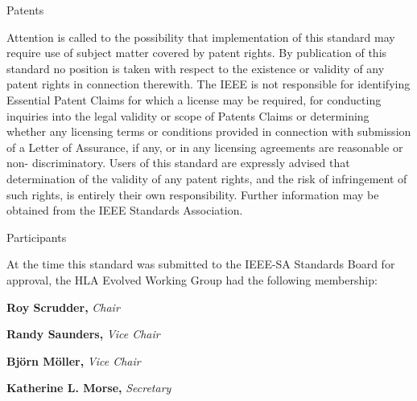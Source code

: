 \vspace{17.73pt}
{\frontSectionHeading Patents\par}

\vspace{12.45pt}
Attention is called to the possibility that implementation of this standard may require use of subject matter\linebreak
covered by patent rights. By publication of this standard no position is taken with respect to the existence or\linebreak
validity of any patent rights in connection therewith. The IEEE is not responsible for identifying Essential\linebreak
Patent Claims for which a license may be required, for conducting inquiries into the legal validity or scope\linebreak
of Patents Claims or determining whether any licensing terms or conditions provided in connection with\linebreak
submission of a Letter of Assurance, if any, or in any licensing agreements are reasonable or non-\linebreak
discriminatory. Users of this standard are expressly advised that determination of the validity of any patent\linebreak
rights, and the risk of infringement of such rights, is entirely their own responsibility. Further information\linebreak
may be obtained from the IEEE Standards Association.\par

\vspace{18.11pt}
{\frontSectionHeading Participants\par}

\vspace{12.42pt}
At the time this standard was submitted to the IEEE-SA Standards Board for approval, the HLA Evolved\linebreak
Working Group had the following membership:\par

\vspace{12.25pt}
{\centering\frontOfficer
\textbf{Roy Scrudder,} \textit{Chair}\par
\textbf{Randy Saunders,} \textit{Vice Chair}\par
\textbf{Björn Möller,} \textit{Vice Chair}\par
\textbf{Katherine L. Morse,} \textit{Secretary}\par}

